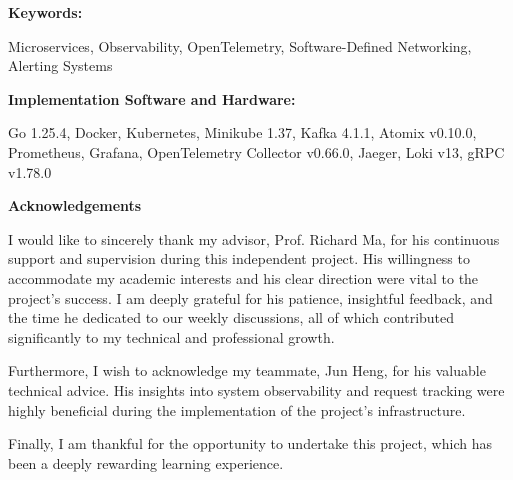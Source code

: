 \documentclass[11pt, a4paper]{article}
\begin{document}
\vspace{0.5cm}

\noindent \textbf{Keywords:}\par
\qquad \qquad Microservices, Observability, OpenTelemetry, Software-Defined Networking, Alerting Systems

\vspace{0.5cm}

\noindent \textbf{Implementation Software and Hardware:}\par
\qquad \qquad Go 1.25.4, Docker, Kubernetes, Minikube 1.37, Kafka 4.1.1, Atomix v0.10.0, Prometheus, Grafana, OpenTelemetry Collector v0.66.0, Jaeger, Loki v13, gRPC v1.78.0

\clearpage %

\begin{center}
    \Large \textbf{Acknowledgements}
\end{center}

\onehalfspacing
I would like to sincerely thank my advisor, Prof. Richard Ma, for his continuous support and supervision during this independent project. His willingness to accommodate my academic interests and his clear direction were vital to the project's success. I am deeply grateful for his patience, insightful feedback, and the time he dedicated to our weekly discussions, all of which contributed significantly to my technical and professional growth.

Furthermore, I wish to acknowledge my teammate, Jun Heng, for his valuable technical advice. His insights into system observability and request tracking were highly beneficial during the implementation of the project's infrastructure.

Finally, I am thankful for the opportunity to undertake this project, which has been a deeply rewarding learning experience.
\newpage


\onehalfspacing 
\tableofcontents
\newpage

\clearpage %
\setcounter{romanpages}{\value{page}} %
\end{document}
